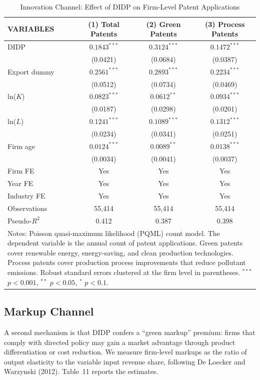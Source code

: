 \documentclass[11pt,a4paper]{article}
\begin{document}
\begin{table}[htbp]
\centering
\caption{Innovation Channel: Effect of DIDP on Firm-Level Patent Applications}
\label{tab:innovation}
\begin{tabular}{lccc}
\toprule
VARIABLES & (1) Total Patents & (2) Green Patents & (3) Process Patents \\
\midrule
DIDP         & $0.1843^{***}$ & $0.3124^{***}$ & $0.1472^{***}$ \\
             & (0.0421) & (0.0684) & (0.0387) \\
Export dummy & $0.2561^{***}$ & $0.2893^{***}$ & $0.2234^{***}$ \\
             & (0.0512) & (0.0734) & (0.0469) \\
ln($K$)      & $0.0823^{***}$ & $0.0612^{**}$ & $0.0934^{***}$ \\
             & (0.0187) & (0.0298) & (0.0201) \\
ln($L$)      & $0.1241^{***}$ & $0.1089^{***}$ & $0.1312^{***}$ \\
             & (0.0234) & (0.0341) & (0.0251) \\
Firm age     & $0.0124^{***}$ & $0.0089^{**}$ & $0.0138^{***}$ \\
             & (0.0034) & (0.0041) & (0.0037) \\
Firm FE      & Yes & Yes & Yes \\
Year FE      & Yes & Yes & Yes \\
Industry FE  & Yes & Yes & Yes \\
Observations & 55{,}414 & 55{,}414 & 55{,}414 \\
Pseudo-$R^2$ & 0.412 & 0.387 & 0.398 \\
\bottomrule
\multicolumn{4}{p{0.85\textwidth}}{\footnotesize Notes: Poisson quasi-maximum likelihood (PQML) count model. The dependent variable is the annual count of patent applications. Green patents cover renewable energy, energy-saving, and clean production technologies. Process patents cover production process improvements that reduce pollutant emissions. Robust standard errors clustered at the firm level in parentheses. $^{***}$ $p<0.001$, $^{**}$ $p<0.05$, $^{*}$ $p<0.1$.}
\end{tabular}
\end{table}

\subsection{Markup Channel}

A second mechanism is that DIDP confers a ``green markup'' premium: firms that comply with directed policy may gain a market advantage through product differentiation or cost reduction. We measure firm-level markups as the ratio of output elasticity to the variable input revenue share, following De Loecker and Warzynski (2012). Table~11 reports the estimates.
\end{document}
